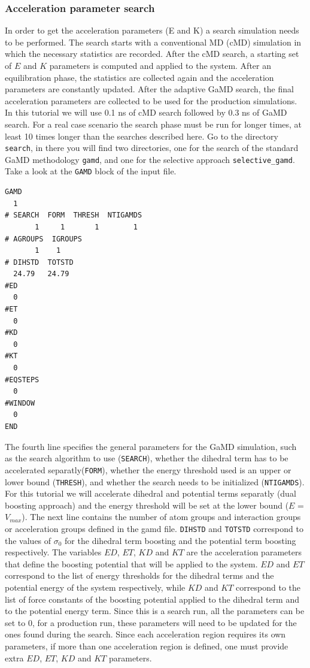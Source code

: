 \subsubsection{Acceleration parameter search}
In order to get the acceleration parameters (E and K) a search simulation needs to be performed. The search starts with a conventional MD (cMD) simulation in which the necessary statistics are recorded. After the cMD search, a starting set of $E$ and $K$ parameters is computed and applied to the system. After an equilibration phase, the statistics are collected again and the acceleration parameters are constantly updated. After the adaptive GaMD search, the final acceleration parameters are collected to be used for the production simulations. In this tutorial we will use 0.1 ns of cMD search followed by 0.3 ns of GaMD search. For a real case scenario the search phase must be run for longer times, at least 10 times longer than the searches described here.
Go to the directory \texttt{search}, in there you will find two directories, one for the search of the standard GaMD methodology \texttt{gamd}, and one for the selective approach \texttt{selective\_gamd}. Take a look at the \texttt{GAMD} block of the input file.
\begin{lstlisting}
GAMD
  1
# SEARCH  FORM  THRESH  NTIGAMDS
       1     1       1        1
# AGROUPS  IGROUPS
       1    1
# DIHSTD  TOTSTD
  24.79   24.79
#ED
  0
#ET
  0
#KD
  0
#KT
  0
#EQSTEPS
  0
#WINDOW
  0
END
\end{lstlisting}
The fourth line specifies the general parameters for the GaMD simulation, such as the search algorithm to use (\texttt{SEARCH}), whether the dihedral term has to be accelerated separatly(\texttt{FORM}), whether the energy threshold used is an upper or lower bound (\texttt{THRESH}), and whether the search needs to be initialized (\texttt{NTIGAMDS}). For this tutorial we will accelerate dihedral and potential terms separatly (dual boosting approach) and the energy threshold will be set at the lower bound ($E$ = $V_{max}$). 
The next line contains the number of atom groups and interaction groups or acceleration groups defined in the gamd file.
\texttt{DIHSTD} and \texttt{TOTSTD} correspond to the values of $\sigma_0$ for the dihedral term boosting and the potential term boosting respectively.  
The variables $ED$, $ET$, $KD$ and $KT$ are the acceleration parameters that define the boosting potential that will be applied to the system. $ED$ and $ET$ correspond to the list of energy thresholds for the dihedral terms and the potential energy of the system respectively, while $KD$ and $KT$ correspond to the list of force constants of the boosting potential applied to the dihedral term and to the potential energy term. Since this is a search run, all the parameters can be set to 0, for a production run, these parameters will need to be updated for the ones found during the search. Since each acceleration region requires its own parameters, if more than one acceleration region is defined, one must provide extra $ED$, $ET$, $KD$ and $KT$ parameters.
